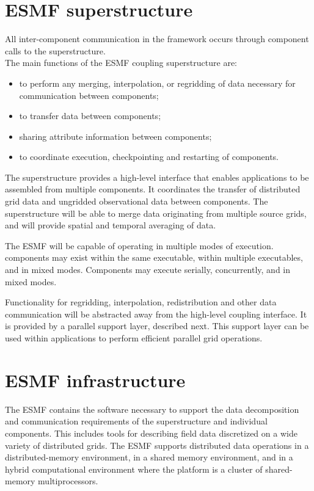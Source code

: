 \section{ESMF superstructure}
\label{sec:ESMF_superstructure}

All inter-component communication in the framework occurs through 
component calls to the superstructure. \\

\noindent The main functions of the ESMF coupling superstructure are:

\begin{itemize}
\item to perform any merging, interpolation, or regridding 
of data necessary for communication between components;
\item to transfer data between components;
\item sharing attribute information between components;
\item to coordinate execution, checkpointing and restarting of
  components.
\end{itemize}

The superstructure provides a high-level interface that enables 
applications to be assembled from multiple components.  It coordinates
the transfer of distributed grid data and ungridded 
observational data between components.  The superstructure will be able 
to merge data originating from multiple source grids, and will 
provide spatial and temporal averaging of data.

The ESMF will be capable of operating in multiple modes of execution.
components may exist within the same executable, within multiple 
executables, and in mixed modes.  Components may execute serially, 
concurrently, and in mixed modes.  

Functionality for regridding, interpolation, redistribution and other 
data communication will be abstracted away from the high-level coupling
interface.  It is provided by a parallel support layer, described next.  
This support layer can be used within applications 
to perform efficient parallel grid operations.

\section{ESMF infrastructure}
\label{sec:ESMF_infrastructure}

The ESMF contains the software necessary to support the data
decomposition and communication requirements of the superstructure and
individual components.  This includes tools for describing field
data discretized on a wide variety of distributed grids.  The ESMF
supports distributed data operations in a distributed-memory environment, 
in a shared memory environment, and in a hybrid computational environment 
where the platform is a cluster of shared-memory multiprocessors.

